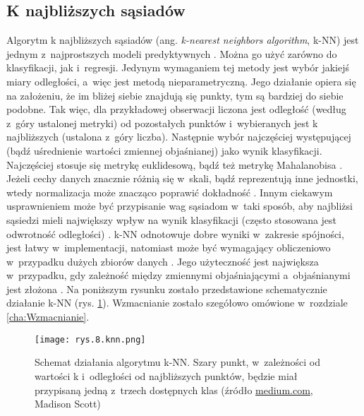 
\subsection{K najbliższych sąsiadów}
\label{cha:K najbliższych sąsiadów}

Algorytm k najbliższych sąsiadów (ang. \textit{k-nearest neighbors algorithm}, k-NN) jest jednym z~najprostszych modeli predyktywnych \cite{Grus18}. Można go użyć zarówno do klasyfikacji, jak i~regresji. Jedynym wymaganiem tej metody jest wybór jakiejś miary odległości, a~więc jest metodą nieparametryczną. Jego działanie opiera się na założeniu, że im bliżej siebie znajdują się punkty, tym są bardziej do siebie podobne. Tak więc, dla przykładowej obserwacji liczona jest odległość (według z~góry ustalonej metryki) od pozostałych punktów i~wybieranych jest k najbliższych (ustalona z~góry liczba). Następnie wybór najczęściej występującej (bądź uśrednienie wartości zmiennej objaśnianej) jako wynik klasyfikacji. Najczęściej stosuje się metrykę euklidesową, bądź też metrykę Mahalanobisa \cite{Jaskowiak70}. Jeżeli cechy danych znacznie różnią się w~skali, bądź reprezentują inne jednostki, wtedy normalizacja może znacząco poprawić dokładność \cite{Piryonesi20}. Innym ciekawym usprawnieniem może być przypisanie wag sąsiadom w~taki sposób, aby najbliżsi sąsiedzi mieli największy wpływ na wynik klasyfikacji (często stosowana jest odwrotność odległości) \cite{wiki:knn}. k-NN odnotowuje dobre wyniki w~zakresie spójności, jest łatwy w~implementacji, natomiast może być wymagający obliczeniowo w~przypadku dużych zbiorów danych \cite{wiki:knn}. Jego użyteczność jest największa w~przypadku, gdy zależność między zmiennymi objaśniającymi a~objaśnianymi jest złożona \cite{wiki:knn}. Na poniższym rysunku zostało przedstawione schematycznie działanie k-NN (rys. \ref{fig:mesh8}). Wzmacnianie zostało szegółowo omówione w~rozdziale \ref{cha:Wzmacnianie}.



\begin{figure}[h]
    \centering
    \texttt{[image: rys.8.knn.png]}
    \caption{Schemat działania algorytmu k-NN. Szary punkt, w~zależności od wartości k i~odległości od najbliższych punktów, będzie miał przypisaną jedną z~trzech dostępnych klas (źródło \protect\href{https://medium.com/capital-one-tech/k-nearest-neighbors-knn-algorithm-for-machine-learning-e883219c8f26}{medium.com}, Madison Scott)}
    \label{fig:mesh8}
\end{figure}

